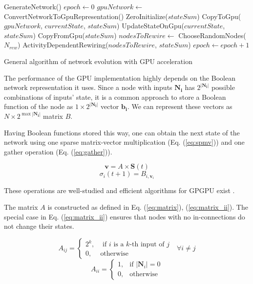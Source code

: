\documentclass[procedia]{easychair}
\begin{document}
	\begin{algorithm}[ht!]
		\label{algo:gpu}
		GenerateNetwork()\;
		$epoch \leftarrow 0$\;
		{
			$gpuNetwork \leftarrow$ ConvertNetworkToGpuRepresentation()\;
			ZeroInitialize($stateSum$)\;
			CopyToGpu($gpuNetwork$, $currentState$, $stateSum$)\;
			{ 	
				UpdateStateOnGpu($currentState$, $stateSum$)\;
			}
			CopyFromGpu($stateSum$)\;
			$nodesToRewire \leftarrow$ ChooseRandomNodes($N_{rew}$)\;
			ActivityDependentRewiring($nodesToRewire$, $stateSum$)\;
			$epoch \leftarrow epoch + 1$\;
		}
		\caption{General algorithm of network evolution with GPU acceleration}
	\end{algorithm}
	
	The performance of the GPU implementation highly depends on the Boolean network representation it uses. Since a node with inputs \(\mathbf{N_i}\) has \(2^{|\mathbf{N_i}|}\) possible combinations of inputs' state, it is a common approach to store a Boolean function of the node as \(1 \times 2^{|\mathbf{N_i}|}\) vector \(\mathbf{b_i}\). We can represent these vectors as \(N \times 2^{\max{|\mathbf{N_i}|}}\) matrix \(B\).
	
	Having Boolean functions stored this way, one can obtain the next state of the network using one sparse matrix-vector multiplication (Eq. (\ref{eq:spmv})) and one gather operation (Eq. (\ref{eq:gather})).
	
	\begin{equation}
	\label{eq:spmv}
		\mathbf{v} = A \times \mathbf{S}(t)
	\end{equation}
	\begin{equation}
	\label{eq:gather}
		\sigma_i(t+1) = B_{i, \mathbf{v}_i}
	\end{equation}
	
	These operations are well-studied and efficient algorithms for GPGPU exist \cite{bell2008efficient}\cite{he2007efficient}.
	
	The matrix \(A\) is constructed as defined in Eq. (\ref{eq:matrix}), (\ref{eq:matrix_ii}). The special case in Eq. (\ref{eq:matrix_ii}) ensures that nodes with no in-connections do not change their states.
	
	\begin{equation}
		\label{eq:matrix}
		A_{ij} = \begin{cases}
			2^k, & \mbox{ if } i\mbox{ is a } k \mbox{-th input of } j \\
			0, & \mbox{otherwise}
		\end{cases} \mbox{  } \forall i \neq j
	\end{equation}
	\begin{equation}
	\label{eq:matrix_ii}
	A_{ii} = \begin{cases}
		1, & \mbox{if } |\mathbf{N}_i|=0\\
		0, & \mbox{otherwise}
		\end{cases}
	\end{equation}
	
\end{document}
